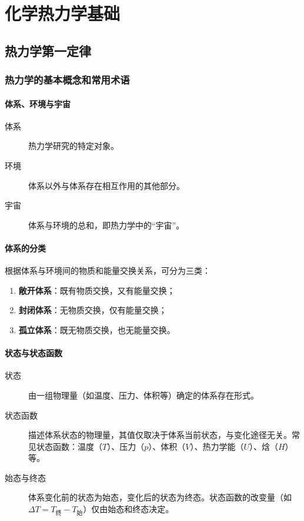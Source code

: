 \chapter{化学热力学基础}

\section{热力学第一定律}

\subsection{热力学的基本概念和常用术语}
\subsubsection{体系、环境与宇宙}
\begin{description}
    \item[体系] 热力学研究的特定对象。
    \item[环境] 体系以外与体系存在相互作用的其他部分。
    \item[宇宙] 体系与环境的总和，即热力学中的``宇宙''。
\end{description}

\subsubsection{体系的分类}
根据体系与环境间的物质和能量交换关系，可分为三类：
\begin{enumerate}
    \item \textbf{敞开体系}：既有物质交换，又有能量交换；
    \item \textbf{封闭体系}：无物质交换，仅有能量交换；
    \item \textbf{孤立体系}：既无物质交换，也无能量交换。
\end{enumerate}

\subsubsection{状态与状态函数}
\begin{description}
    \item[状态] 由一组物理量（如温度、压力、体积等）确定的体系存在形式。
    \item[状态函数] 描述体系状态的物理量，其值仅取决于体系当前状态，与变化途径无关。常见状态函数：温度（$T$）、压力（$p$）、体积（$V$）、热力学能（$U$）、焓（$H$）等。
    \item[始态与终态] 体系变化前的状态为始态，变化后的状态为终态。状态函数的改变量（如$\Delta T = T_{\text{终}} - T_{\text{始}}$）仅由始态和终态决定。
\end{description}

